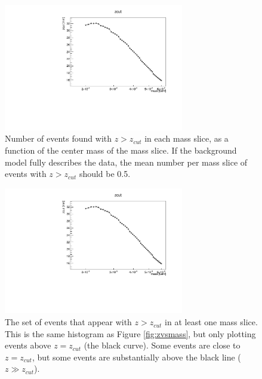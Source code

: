 \begin{figure}[ht]
\begin{center}
    \includegraphics[width=0.7\textwidth,page=8,angle=-90]{vertexing/figs/golden_mres_output}
\end{center}
\caption{Number of events found with $z>z_{cut}$ in each mass slice, as a function of the center mass of the mass slice.
If the background model fully describes the data, the mean number per mass slice of events with $z>z_{cut}$ should be 0.5.}
    \label{fig:n_candidates}
\end{figure}

\begin{figure}[ht]
\begin{center}
    \includegraphics[width=0.7\textwidth,page=4,angle=-90]{vertexing/figs/golden_mres_output}
\end{center}
\caption{The set of events that appear with $z>z_{cut}$ in at least one mass slice.
This is the same histogram as Figure \ref{fig:zvsmass}, but only plotting events above $z=z_{cut}$ (the black curve).
Some events are close to $z=z_{cut}$, but some events are substantially above the black line ($z\gg z_{cut}$).}
    \label{fig:zvsmass_candidates}
\end{figure}

